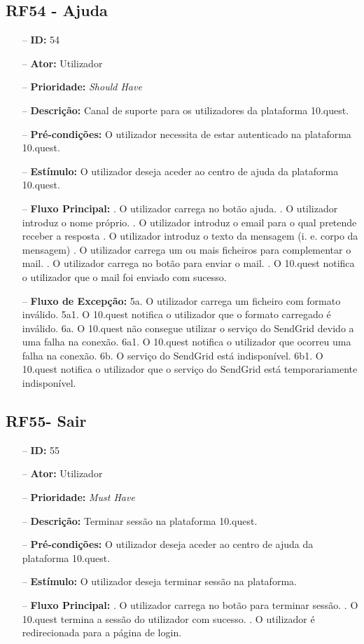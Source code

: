 \subsection{RF54 - Ajuda}
\begin{itemize}
	\item[--] \textbf{ID:} 54
	\item[--]  \textbf{Ator:} Utilizador
	\item[--]  \textbf{Prioridade:} \textit{Should Have}
	\item[--]  \textbf{Descrição:} Canal de suporte para os utilizadores da plataforma 10.quest.
	\item[--]  \textbf{Pré-condições:} O utilizador necessita de estar autenticado na plataforma 10.quest.
	\item[--]  \textbf{Estímulo:} O utilizador deseja aceder ao centro de ajuda da plataforma 10.quest.
	\item[--]  \textbf{Fluxo Principal:} 
	. O utilizador carrega no botão ajuda.
	. O utilizador introduz o nome próprio.
	. O utilizador introduz o email para o qual pretende receber a resposta
	. O utilizador introduz o texto da mensagem (i. e. corpo da mensagem)
	. O utilizador carrega um ou mais ficheiros para complementar o mail.
	. O utilizador carrega no botão para enviar o mail.
	. O 10.quest notifica o utilizador que o mail foi enviado com sucesso.
	\item[--]  \textbf{Fluxo de Excepção:} 
	\subitem 5a. O utilizador carrega um ficheiro com formato inválido.
	\subitem 5a1. O 10.quest notifica o utilizador que o formato carregado é inválido.
	\subitem 6a. O 10.quest não consegue utilizar o serviço do SendGrid devido a uma falha na conexão.
	\subitem 6a1. O 10.quest notifica o utilizador que ocorreu uma falha na conexão.
	\subitem 6b. O serviço do SendGrid está indisponível.
	\subitem 6b1. O 10.quest notifica o utilizador que o serviço do SendGrid está temporariamente indisponível. 
\end{itemize}
\newpage

\subsection{RF55- Sair}
\begin{itemize}
	\item[--] \textbf{ID:} 55
	\item[--]  \textbf{Ator:} Utilizador
	\item[--]  \textbf{Prioridade:} \textit{Must Have}
	\item[--]  \textbf{Descrição:} Terminar sessão na plataforma 10.quest.
	\item[--]  \textbf{Pré-condições:} O utilizador deseja aceder ao centro de ajuda da plataforma 10.quest.
	\item[--]  \textbf{Estímulo:} O utilizador deseja terminar sessão na plataforma.
	\item[--]  \textbf{Fluxo Principal:} 
	. O utilizador carrega no botão para terminar sessão.
	. O 10.quest termina a sessão do utilizador com sucesso.
	. O utilizador é redirecionada para a página de login.
\end{itemize}
\newpage

